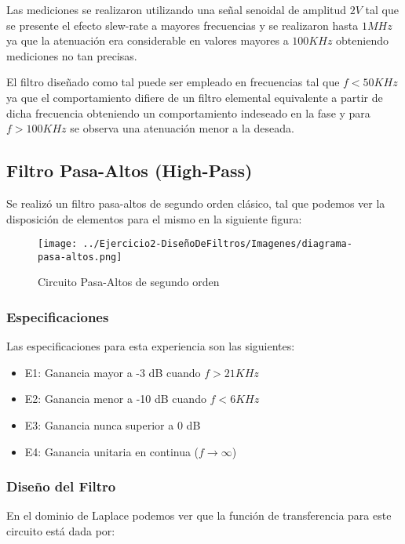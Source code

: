 Las mediciones se realizaron utilizando una señal senoidal de amplitud $2V$ tal que se presente el efecto slew-rate a mayores frecuencias y se realizaron
hasta $1MHz$ ya que la atenuación era considerable en valores mayores a $100 KHz$ obteniendo mediciones no tan precisas.

El filtro diseñado como tal puede ser empleado en frecuencias tal que $f < 50 KHz$ ya que el comportamiento difiere de un filtro elemental equivalente a partir de dicha
frecuencia obteniendo un comportamiento indeseado en la fase y para $f > 100 KHz$ se observa una atenuación menor a la deseada. 


\subsection{Filtro Pasa-Altos (High-Pass)}

Se realizó un filtro pasa-altos de segundo orden clásico, tal que podemos
ver la disposición de elementos para el mismo en la siguiente figura:

\begin{figure}[H]
    \centering
    \texttt{[image: ../Ejercicio2-DiseñoDeFiltros/Imagenes/diagrama-pasa-altos.png]}
    \caption{Circuito Pasa-Altos de segundo orden}
\end{figure}

\subsubsection{Especificaciones}

Las especificaciones para esta experiencia son las siguientes:

\begin{itemize}
	\item E1: Ganancia mayor a -3 dB cuando $f > 21 KHz$ 
	\item E2: Ganancia menor a -10 dB cuando $f < 6 KHz $
	\item E3: Ganancia nunca superior a 0 dB
	\item E4: Ganancia unitaria en continua ($f \to \infty$)
\end{itemize}

\subsubsection{Diseño del Filtro}

En el dominio de Laplace podemos ver que la función de transferencia para este circuito está dada por:

